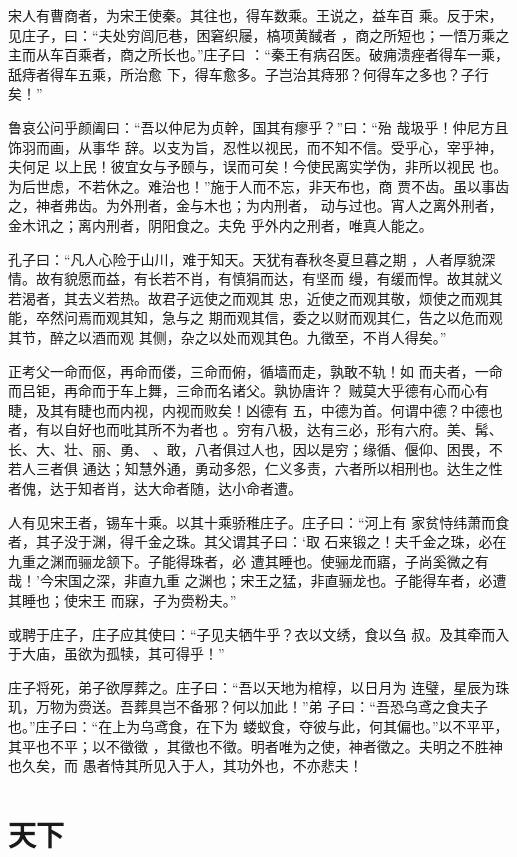 \documentclass[a4paper,12pt,UTF8,twoside]{ctexbook}
\begin{document}
宋人有曹商者，为宋王使秦。其往也，得车数乘。王说之，益车百 乘。反于宋，见庄子，曰：“夫处穷闾厄巷，困窘织屦，槁项黄馘者 ，商之所短也；一悟万乘之主而从车百乘者，商之所长也。”庄子曰 ：“秦王有病召医。破痈溃痤者得车一乘，舐痔者得车五乘，所治愈 下，得车愈多。子岂治其痔邪？何得车之多也？子行矣！”

鲁哀公问乎颜阖曰：“吾以仲尼为贞幹，国其有瘳乎？”曰：“殆 哉圾乎！仲尼方且饰羽而画，从事华 辞。以支为旨，忍性以视民，而不知不信。受乎心，宰乎神，夫何足 以上民！彼宜女与予颐与，误而可矣！今使民离实学伪，非所以视民 也。为后世虑，不若休之。难治也！”施于人而不忘，非天布也，商 贾不齿。虽以事齿之，神者弗齿。为外刑者，金与木也；为内刑者， 动与过也。宵人之离外刑者，金木讯之；离内刑者，阴阳食之。夫免 乎外内之刑者，唯真人能之。

孔子曰：“凡人心险于山川，难于知天。天犹有春秋冬夏旦暮之期 ，人者厚貌深情。故有貌愿而益，有长若不肖，有慎狷而达，有坚而 缦，有缓而悍。故其就义若渴者，其去义若热。故君子远使之而观其 忠，近使之而观其敬，烦使之而观其能，卒然问焉而观其知，急与之 期而观其信，委之以财而观其仁，告之以危而观其节，醉之以酒而观 其侧，杂之以处而观其色。九徵至，不肖人得矣。”

正考父一命而伛，再命而偻，三命而俯，循墙而走，孰敢不轨！如 而夫者，一命而吕钜，再命而于车上舞，三命而名诸父。孰协唐许？ 贼莫大乎德有心而心有睫，及其有睫也而内视，内视而败矣！凶德有 五，中德为首。何谓中德？中德也者，有以自好也而吡其所不为者也 。穷有八极，达有三必，形有六府。美、髯、长、大、壮、丽、勇、 、敢，八者俱过人也，因以是穷；缘循、偃仰、困畏，不若人三者俱 通达；知慧外通，勇动多怨，仁义多责，六者所以相刑也。达生之性 者傀，达于知者肖，达大命者随，达小命者遭。

人有见宋王者，锡车十乘。以其十乘骄稚庄子。庄子曰：“河上有 家贫恃纬萧而食者，其子没于渊，得千金之珠。其父谓其子曰：‘取 石来锻之！夫千金之珠，必在九重之渊而骊龙颔下。子能得珠者，必 遭其睡也。使骊龙而寤，子尚奚微之有哉！’今宋国之深，非直九重 之渊也；宋王之猛，非直骊龙也。子能得车者，必遭其睡也；使宋王 而寐，子为赍粉夫。”

或聘于庄子，庄子应其使曰：“子见夫牺牛乎？衣以文绣，食以刍 叔。及其牵而入于大庙，虽欲为孤犊，其可得乎！”

庄子将死，弟子欲厚葬之。庄子曰：“吾以天地为棺椁，以日月为 连璧，星辰为珠玑，万物为赍送。吾葬具岂不备邪？何以加此！”弟 子曰：“吾恐乌鸢之食夫子也。”庄子曰：“在上为乌鸢食，在下为 蝼蚁食，夺彼与此，何其偏也。”以不平平，其平也不平；以不徵徵 ，其徵也不徵。明者唯为之使，神者徵之。夫明之不胜神也久矣，而 愚者恃其所见入于人，其功外也，不亦悲夫！
\section{天下}
\end{document}
